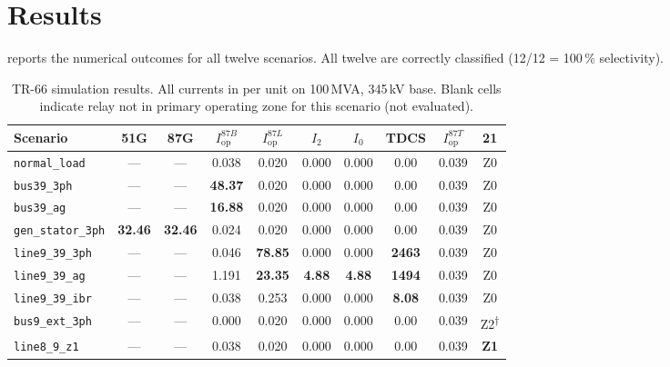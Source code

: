 \documentclass[12pt,a4paper]{article}
\newcommand{\Iop}{I_{\mathrm{op}}}
\begin{document}
\section{Results}
\label{sec:results}

 reports the numerical outcomes for all twelve scenarios.
All twelve are correctly classified (12/12 = 100\,\% selectivity).

\begin{table}[H]
\centering
\caption{TR-66 simulation results.  All currents in per unit on
  100\,MVA, 345\,kV base.  Blank cells indicate relay not in primary
  operating zone for this scenario (not evaluated).}
\label{tab:results}
\setlength{\tabcolsep}{3.5pt}
\footnotesize
\begin{tabular}{lccccccccc}
\toprule
Scenario
  & \multicolumn{1}{c}{51G}
  & \multicolumn{1}{c}{87G}
  & \multicolumn{1}{c}{$\Iop^{87B}$}
  & \multicolumn{1}{c}{$\Iop^{87L}$}
  & \multicolumn{1}{c}{$I_2$}
  & \multicolumn{1}{c}{$I_0$}
  & \multicolumn{1}{c}{TDCS}
  & \multicolumn{1}{c}{$\Iop^{87T}$}
  & \multicolumn{1}{c}{21} \\
\midrule
\texttt{normal\_load}    & ---   & ---    & 0.038  & 0.020 & 0.000 & 0.000 & 0.00  & 0.039  & Z0 \\
\texttt{bus39\_3ph}      & ---   & ---    & \textbf{48.37} & 0.020 & 0.000 & 0.000 & 0.00  & 0.039  & Z0 \\
\texttt{bus39\_ag}       & ---   & ---    & \textbf{16.88} & 0.020 & 0.000 & 0.000 & 0.00  & 0.039  & Z0 \\
\texttt{gen\_stator\_3ph}& \textbf{32.46} & \textbf{32.46} & 0.024 & 0.020 & 0.000 & 0.000 & 0.00 & 0.039 & Z0 \\
\texttt{line9\_39\_3ph}  & ---   & ---    & 0.046  & \textbf{78.85}& 0.000 & 0.000 & \textbf{2463} & 0.039 & Z0 \\
\texttt{line9\_39\_ag}   & ---   & ---    & 1.191  & \textbf{23.35}& \textbf{4.88} & \textbf{4.88} & \textbf{1494} & 0.039 & Z0 \\
\texttt{line9\_39\_ibr}  & ---   & ---    & 0.038  & 0.253 & 0.000 & 0.000 & \textbf{8.08} & 0.039 & Z0 \\
\texttt{bus9\_ext\_3ph}  & ---   & ---    & 0.000  & 0.020 & 0.000 & 0.000 & 0.00  & 0.039  & Z2\textsuperscript{†} \\
\texttt{line8\_9\_z1}    & ---   & ---    & 0.038  & 0.020 & 0.000 & 0.000 & 0.00  & 0.039  & \textbf{Z1} \\

\end{tabular}
\end{table}
\end{document}
